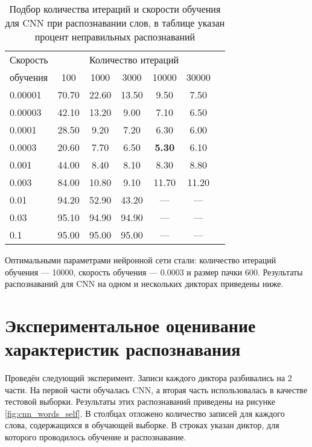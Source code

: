 \begin{table}[h]
	\centering
	\caption{Подбор количества итераций и скорости обучения для CNN при распознавании слов, в таблице указан процент неправильных распознаваний}
	\label{tab:cnn_bf_iter_pace}
	\begin{tabular}{| l | c | c | c | c | c | c |}
		\hline
		Скорость & \multicolumn{5}{c|}{Количество итераций} \\
		\hhline{~-----}
		обучения \phantom{00} & \phantom{000} 100 \phantom{000} & \phantom{000}1000\phantom{000} & \phantom{000}3000\phantom{000} & \phantom{00} 10000 \phantom{00} & \phantom{00} 30000 \phantom{00} \\
		\hline
		0.00001	& 70.70 & 22.60 & 13.50 &  9.50 &  7.50 \\
		0.00003	& 42.10 & 13.20 &  9.00 &  7.10 &  6.50 \\
		0.0001	& 28.50 &  9.20 &  7.20 &  6.30 &  6.00 \\
		0.0003	& 20.60 &  7.70 &  6.50 & \textbf{5.30} &  6.10 \\
		0.001	& 44.00 &  8.40 &  8.10 &  8.30 &  8.80 \\
		0.003	& 84.00 & 10.80 &  9.10 & 11.70 & 11.20 \\
		0.01	& 94.20 & 52.90 & 43.20 & \multicolumn{1}{c|}{---} & \multicolumn{1}{c|}{---} \\	
		0.03	& 95.10 & 94.90 & 94.90 & \multicolumn{1}{c|}{---} & \multicolumn{1}{c|}{---} \\	
		0.1		& 95.00 & 95.00 & 95.00 & \multicolumn{1}{c|}{---} & \multicolumn{1}{c|}{---} \\
		\hline
	\end{tabular}
\end{table}

Оптимальными параметрами нейронной сети стали: количество итераций обучения --- 10000, скорость обучения --- 0.0003 и размер пачки 600.
Результаты распознаваний для CNN на одном и нескольких дикторах приведены ниже.


\section{Экспериментальное оценивание характеристик распознавания} \label{sect4_3}

Проведён следующий эксперимент.
Записи каждого диктора разбивались на 2 части.
На первой части обучалась CNN, а вторая часть использовалась в качестве тестовой выборки.
Результаты этих распознаваний приведены на рисунке \ref{fig:cnn_words_self}.
В столбцах отложено количество записей для каждого слова, содержащихся в обучающей выборке.
В строках указан диктор, для которого проводилось обучение и распознавание.

